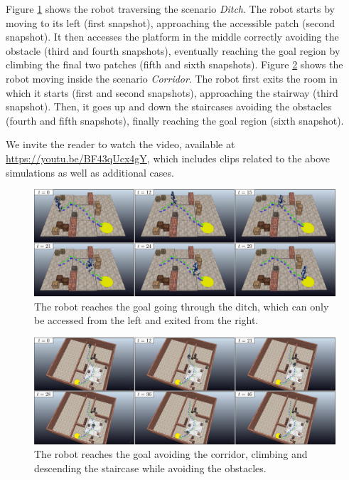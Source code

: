 Figure \ref{fig:WoS:offlineCase:Ditch:Snapshots} shows the robot traversing the
scenario \textit{Ditch}. The robot starts by moving to its left (first
snapshot), approaching the accessible patch (second snapshot). It then accesses
the platform in the middle correctly avoiding the obstacle (third and fourth
snapshots), eventually reaching the goal region by climbing the final two
patches (fifth and sixth snapshots).
Figure \ref{fig:WoS:offlineCase:Corridor:Snapshots} shows the robot moving
inside the scenario \textit{Corridor}. The robot first exits the room in which
it starts (first and second snapshots), approaching the stairway (third
snapshot). Then, it goes up and down the staircases avoiding the obstacles
(fourth and fifth snapshots), finally reaching the goal region (sixth snapshot).

We invite the reader to watch the video, available at
\url{https://youtu.be/BF43qUcx4gY}, which includes 
clips related to the above simulations as well as additional cases.

\begin{figure}
    \centering
    \includegraphics[width=\textwidth]{figures/OfflineDitch.png}
    \caption{The robot reaches the goal going through the ditch, which can only
        be accessed from the left and exited from the right.}
    \label{fig:WoS:offlineCase:Ditch:Snapshots}
\end{figure}
\begin{figure}
    \centering
    \includegraphics[width=\textwidth]{figures/OfflineCorridor.png}
    \caption{The robot reaches the goal avoiding the
    corridor, climbing and descending the staircase while
    avoiding the obstacles.}
    \label{fig:WoS:offlineCase:Corridor:Snapshots}
\end{figure}


